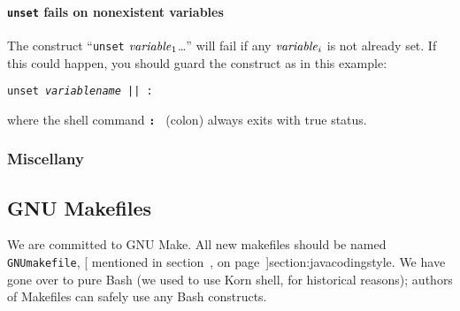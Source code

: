 \paragraph{{\bf \tt unset} fails on nonexistent variables}
The construct ``{\tt unset} \(\mbox{\textit{variable}}_1\)\ldots'' will
fail if any \(\mbox{\textit{variable}}_i\) is not already set.
If this could happen, you should guard the construct as in this
example:
\begin{example}
\texttt{unset \textit{variablename} || :}
\end{example} 
where the shell command {\bf \tt : } (colon) always exits with true
status.



\subsubsection{Miscellany}

\subsection{GNU Makefiles} 

We are committed to GNU Make.  All new makefiles should be named {\tt
GNUmakefile}, [
  mentioned in section~\Ref, on page~\Pageref]{section:javacodingstyle}.  We have gone
over to pure Bash 
(we used to use Korn shell, for historical reasons); authors of
Makefiles can safely use any Bash constructs.

